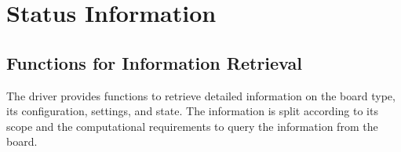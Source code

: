 \section{Status Information}
	

\subsection{Functions for Information Retrieval}
The driver provides functions to retrieve detailed information on the
board type, its configuration, settings, and state.  The information is
split according to its scope and the computational requirements to query
the information from the board.


